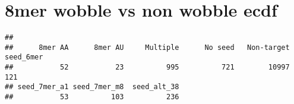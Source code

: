 \documentclass[
]{article}
\newenvironment{Shaded}{\begin{snugshade}}{\end{snugshade}}
\newcommand{\CommentTok}[1]{\textcolor[rgb]{0.56,0.35,0.01}{\textit{#1}}}
\newcommand{\FunctionTok}[1]{\textcolor[rgb]{0.13,0.29,0.53}{\textbf{#1}}}
\newcommand{\NormalTok}[1]{#1}
\newcommand{\OtherTok}[1]{\textcolor[rgb]{0.56,0.35,0.01}{#1}}
\newcommand{\SpecialCharTok}[1]{\textcolor[rgb]{0.81,0.36,0.00}{\textbf{#1}}}
\newcommand{\StringTok}[1]{\textcolor[rgb]{0.31,0.60,0.02}{#1}}
\begin{document}
\hypertarget{mer-wobble-vs-non-wobble-ecdf}{%
\section{8mer wobble vs non wobble
ecdf}\label{mer-wobble-vs-non-wobble-ecdf}}

\begin{Shaded}
\end{Shaded}

\begin{verbatim}
## 
##      8mer AA      8mer AU     Multiple      No seed   Non-target    seed_6mer 
##           52           23          995          721        10997          121 
## seed_7mer_a1 seed_7mer_m8  seed_alt_38 
##           53          103          236
\end{verbatim}
\end{document}
